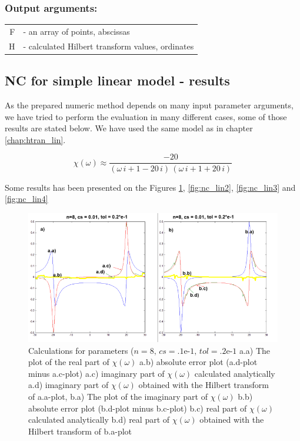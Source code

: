 \documentclass[12pt,twoside,a4paper]{article}
\numberwithin{equation}{subsection}
\numberwithin{figure}{subsection}
\begin{document}
\subsubsection*{Output arguments:}
\begin{tabular}{r l}
  F & - an array of points, abscissas \\
  H & - calculated Hilbert transform values, ordinates \\
\end{tabular}

\subsection{NC for simple linear model - results} \label{chap:nc_lin}

As the prepared numeric method depends on many input parameter arguments, we have tried to perform the evaluation in many different
cases, some of those results are stated below. We have used the same model as in chapter \ref{chap:htran_lin}.

\begin{equation} \label{eq:nc_algoritm}
  \chi (\omega ) \approx \frac { - 20}{(\omega \,i + 1 - 20\,i)\,(\omega \,i + 1 + 20\,i)}
\end{equation} 

Some results has been presented on the Figures \ref{fig:nc_lin1}, \ref{fig:nc_lin2}, \ref{fig:nc_lin3} and \ref{fig:nc_lin4}

\begin{figure}
  \includegraphics[width=150mm]{img/nc_lin1.png}
  \caption{Calculations for parameters ($n=8, \,c s=\mbox{.1e-1}, \,tol=\mbox{.2e-1}$ 
     a.a) The plot of the real part of $\chi (\omega )$ 
     a.b) absolute error plot (a.d-plot minus a.c-plot) 
     a.c) imaginary part of $\chi (\omega )$ calculated analytically 
     a.d) imaginary part of $\chi (\omega )$ obtained with the Hilbert transform of a.a-plot, 
     b.a) The plot of the imaginary part of $\chi (\omega )$ 
     b.b) absolute error plot (b.d-plot minus b.c-plot) 
     b.c) real part of $\chi (\omega )$ calculated analytically 
     b.d) real part of $\chi (\omega )$ obtained with the Hilbert transform of b.a-plot 
     \label{fig:nc_lin1}
  }
\end{figure}
\end{document}
